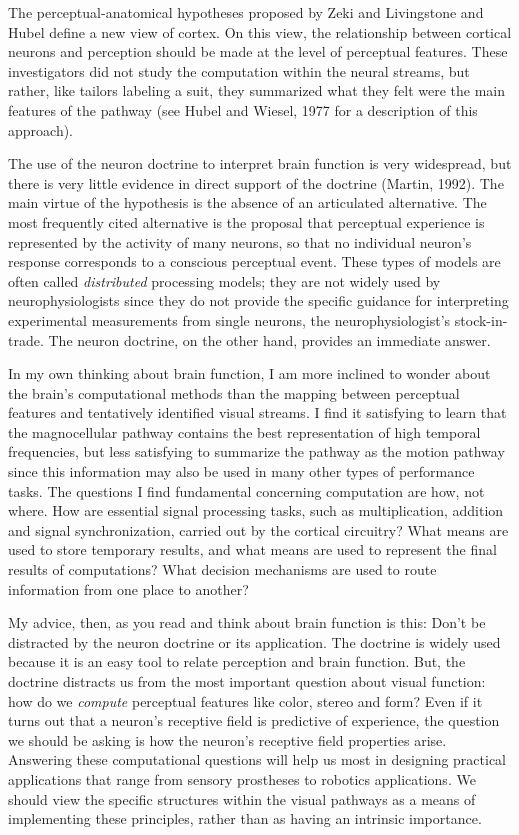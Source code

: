 The perceptual-anatomical
hypotheses proposed by Zeki and Livingstone and Hubel
define a new view of cortex.
On this view, the relationship between cortical neurons and
perception should be made at the level of perceptual features.
These investigators did not study the computation within the
neural streams, but rather, like tailors labeling a suit, they
summarized what they felt were the main features of the pathway
(see Hubel and Wiesel, 1977 for a description of this approach).

The use of the neuron doctrine to interpret brain function
is very widespread, but
there is very little evidence in direct support of the doctrine
(Martin, 1992).
The main virtue of the hypothesis
is the absence of an articulated alternative.
The most frequently cited alternative is
the proposal that perceptual experience
is represented by the activity of many neurons,
so that no individual neuron's response corresponds to
a conscious perceptual event.
These types of models are often called
{\em distributed} processing models;
they are not widely used by neurophysiologists
since they do not provide the specific guidance
for interpreting experimental measurements from single neurons,
the neurophysiologist's stock-in-trade.
The neuron doctrine, on the other hand, provides
an immediate answer.

In my own thinking about brain function, I am more inclined to
wonder about the brain's computational methods
than the mapping between perceptual features and 
tentatively identified visual streams.
I find it satisfying to learn that the magnocellular pathway
contains the best representation of high temporal frequencies,
but less satisfying to summarize the pathway as the motion pathway
since this information may also be used in many other types of
performance tasks.
The questions I find fundamental concerning computation
are how, not where.
How are essential signal processing tasks,
such as multiplication, addition and signal synchronization,
carried out by the cortical circuitry?
What means are used to store temporary results, and what
means are used to represent the final results of computations?
What decision mechanisms are used to route information from one
place to another?

My advice, then,
as you read and think about brain function is this:
Don't be distracted by the neuron doctrine or its application.
The doctrine is widely used because it is an easy tool to relate
perception and brain function.
But, the doctrine distracts us from
the most important question about visual function:
how do we {\em compute} perceptual features like color, stereo and form?
Even if it turns out that a neuron's receptive field is predictive
of experience, the question we should be asking is how the
neuron's receptive field properties arise.
Answering these computational questions will help us
most in designing practical applications
that range from sensory prostheses to robotics applications.
We should view the specific structures within
the visual pathways as a means of implementing these principles,
rather than as having an intrinsic importance.

